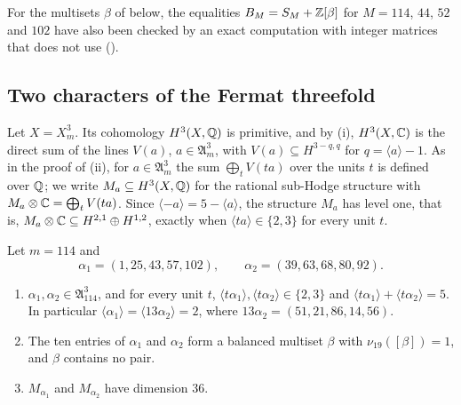 For the multisets $\beta$ of
 below, the equalities
$B_{M}=S_{M}+\mathbb{Z}[\beta]$ for $M=114$, $44$, $52$ and $102$ have also been
checked by an exact computation with integer matrices that
does not use  ().

\subsection{Two characters of the Fermat threefold}\label{ssec:twochars}
Let $X=X^{3}_{m}$. Its cohomology $H^{3}(X,\mathbb{Q})$ is primitive, and by
(i), $H^{3}(X,\mathbb{C})$ is the direct sum of the lines
$V(a)$, $a\in\mathfrak A^{3}_{m}$, with $V(a)\subseteq H^{3-q,q}$ for
$q=\langle a\rangle-1$. As in the proof of (ii), for
$a\in\mathfrak A^{3}_{m}$ the sum $\bigoplus_{t}V(ta)$ over the units $t$ is
defined over $\mathbb{Q}$; we write $M_{a}\subseteq H^{3}(X,\mathbb{Q})$ for the rational
sub-Hodge structure with $M_{a}\otimes\mathbb{C}=\bigoplus_{t}V(ta)$. Since
$\langle-a\rangle=5-\langle a\rangle$, the structure $M_{a}$ has level one,
that is, $M_{a}\otimes\mathbb{C}\subseteq H^{2,1}\oplus H^{1,2}$, exactly when
$\langle ta\rangle\in\{2,3\}$ for every unit $t$.

\begin{lemma}\label{lem:twochars}
Let $m=114$ and
\[
  \alpha_{1}=(1,25,43,57,102),\qquad \alpha_{2}=(39,63,68,80,92).
\]
\begin{enumerate}[label=\textup{(\alph*)}]
\item $\alpha_{1},\alpha_{2}\in\mathfrak A^{3}_{114}$, and for every unit $t$,
$\langle t\alpha_{1}\rangle,\langle t\alpha_{2}\rangle\in\{2,3\}$ and
$\langle t\alpha_{1}\rangle+\langle t\alpha_{2}\rangle=5$. In particular
$\langle\alpha_{1}\rangle=\langle13\alpha_{2}\rangle=2$, where
$13\alpha_{2}=(51,21,86,14,56)$.
\item The ten entries of $\alpha_{1}$ and $\alpha_{2}$ form a balanced
multiset $\beta$ with $\nu_{19}([\beta])=1$, and $\beta$ contains no pair.
\item $M_{\alpha_{1}}$ and $M_{\alpha_{2}}$ have dimension $36$.
\end{enumerate}
\end{lemma}

